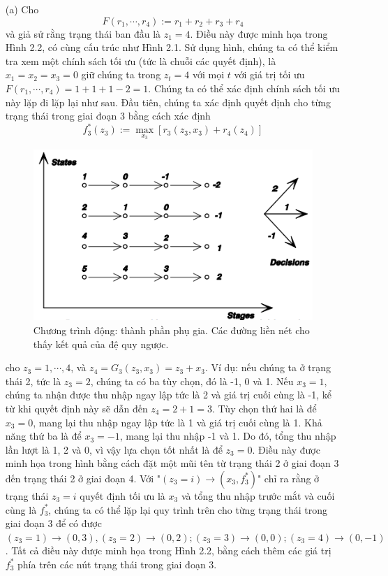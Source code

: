 \documentclass[12pt,a4paper]{report}
\begin{document}
	\begin{itemize}
		\item[(a)] Cho $$F(r_1,\cdots, r_4) := r_1 + r_2 + r_3 + r_4 $$ và giả sử rằng trạng thái ban đầu là $z_1 = 4$. Điều này được minh họa trong Hình 2.2, có cùng cấu trúc như Hình 2.1. Sử dụng hình, chúng ta có thể kiểm tra xem một chính sách tối ưu (tức là chuỗi các quyết định), là $x_1 = x_2 = x_3 = 0$ giữ chúng ta trong $z_t = 4$ với mọi $t$ với giá trị tối ưu $F (r_1,\cdots,r_4) = 1 + 1 + 1 - 2 = 1.$ Chúng ta có thể xác định chính sách tối ưu này lặp đi lặp lại như sau. Đầu tiên, chúng ta xác định quyết định cho từng trạng thái trong giai đoạn 3 bằng cách xác định $$f^*_3(z_3) := \max_{x_3}[r_3(z_3,x_3) + r_4(z_4)]$$
		
		\begin{figure}[h]
		\centering
		\includegraphics[scale=.85]{hinh2.png}
		\caption{Chương trình động: thành phần phụ gia. Các đường liền nét cho thấy
			kết quả của đệ quy ngược.}
		\end{figure}
		
		cho $z_3 = 1, \cdots, 4$,  và $z_4 = G_3 (z_3, x_3) = z_3 + x_3$. Ví dụ: nếu chúng ta ở trạng thái 2, tức là $z_3 = 2$, chúng ta có ba tùy chọn, đó là -1, 0 và 1. Nếu $x_3 = 1$, chúng ta nhận được thu nhập ngay lập tức là 2 và giá trị cuối cùng là -1, kể từ khi quyết định này sẽ dẫn đến $z_4 = 2 + 1 = 3$. 
		Tùy chọn thứ hai là để $x_3 = 0$, mang lại thu nhập ngay lập tức là 1 và giá trị cuối cùng là 1. 
		Khả năng thứ ba là để $x_3 = -1$, mang lại thu nhập -1 và 1. Do đó, tổng thu nhập lần lượt là 1, 2 và 0, vì vậy lựa chọn tốt nhất là để $z_3 = 0$. Điều này được minh họa trong hình bằng cách đặt một mũi tên từ trạng thái 2 ở giai đoạn 3 đến trạng thái 2 ở giai đoạn 4. Với "$(z_3 = i) \to (x_3, f^*_3)$" chỉ ra rằng ở trạng thái $z_3 = i$ quyết định tối ưu là $x_3$ và tổng thu nhập trước mắt và cuối cùng là $f_3^*$, chúng ta có thể lặp lại quy trình trên cho từng trạng thái trong giai đoạn 3 để có được $(z_3 = 1 ) \to (0, 3), (z_3 = 2) \to (0, 2); (z_3 = 3) \to (0, 0); (z_3 = 4) \to (0, -1)$. Tất cả điều này được minh họa trong Hình 2.2, bằng cách thêm các giá trị $f^*_3$ phía trên các nút trạng thái trong giai đoạn 3.
		

\end{itemize}
\end{document}

